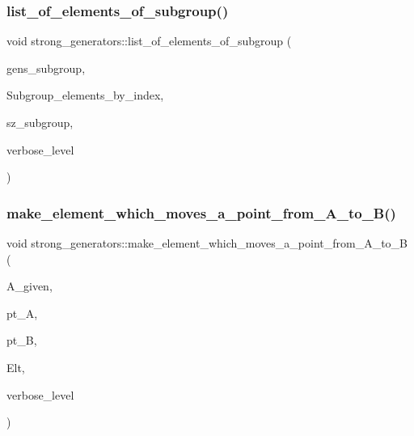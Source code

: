 \subsubsection{\texorpdfstring{list\+\_\+of\+\_\+elements\+\_\+of\+\_\+subgroup()}{list\_of\_elements\_of\_subgroup()}}
{\footnotesize\ttfamily void strong\+\_\+generators\+::list\+\_\+of\+\_\+elements\+\_\+of\+\_\+subgroup (\begin{DoxyParamCaption}\item[{\mbox{\hyperlink{classstrong__generators}{strong\+\_\+generators}} $\ast$}]{gens\+\_\+subgroup,  }\item[{\mbox{\hyperlink{galois_8h_a09fddde158a3a20bd2dcadb609de11dc}{I\+NT}} $\ast$\&}]{Subgroup\+\_\+elements\+\_\+by\+\_\+index,  }\item[{\mbox{\hyperlink{galois_8h_a09fddde158a3a20bd2dcadb609de11dc}{I\+NT}} \&}]{sz\+\_\+subgroup,  }\item[{\mbox{\hyperlink{galois_8h_a09fddde158a3a20bd2dcadb609de11dc}{I\+NT}}}]{verbose\+\_\+level }\end{DoxyParamCaption})}

\mbox{\label{classstrong__generators_a79373238f3c6236b063333312b2564a8}} 
\subsubsection{\texorpdfstring{make\+\_\+element\+\_\+which\+\_\+moves\+\_\+a\+\_\+point\+\_\+from\+\_\+\+A\+\_\+to\+\_\+\+B()}{make\_element\_which\_moves\_a\_point\_from\_A\_to\_B()}}
{\footnotesize\ttfamily void strong\+\_\+generators\+::make\+\_\+element\+\_\+which\+\_\+moves\+\_\+a\+\_\+point\+\_\+from\+\_\+\+A\+\_\+to\+\_\+B (\begin{DoxyParamCaption}\item[{\mbox{\hyperlink{classaction}{action}} $\ast$}]{A\+\_\+given,  }\item[{\mbox{\hyperlink{galois_8h_a09fddde158a3a20bd2dcadb609de11dc}{I\+NT}}}]{pt\+\_\+A,  }\item[{\mbox{\hyperlink{galois_8h_a09fddde158a3a20bd2dcadb609de11dc}{I\+NT}}}]{pt\+\_\+B,  }\item[{\mbox{\hyperlink{galois_8h_a09fddde158a3a20bd2dcadb609de11dc}{I\+NT}} $\ast$}]{Elt,  }\item[{\mbox{\hyperlink{galois_8h_a09fddde158a3a20bd2dcadb609de11dc}{I\+NT}}}]{verbose\+\_\+level }\end{DoxyParamCaption})}

